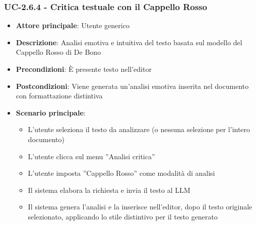 \documentclass[11pt,a4paper]{article}
\begin{document}
\subsubsection{UC-2.6.4 - Critica testuale con il Cappello Rosso}
\begin{itemize}
    \item \textbf{Attore principale}: Utente generico
    \item \textbf{Descrizione}: Analisi emotiva e intuitiva del testo basata sul modello del Cappello Rosso di De Bono
    \item \textbf{Precondizioni}: È presente testo nell’editor
    \item \textbf{Postcondizioni}: Viene generata un’analisi emotiva inserita nel documento con formattazione distintiva
    \item \textbf{Scenario principale}:
    \begin{itemize}
        \item L’utente seleziona il testo da analizzare (o nessuna selezione per l'intero documento)
        \item L’utente clicca sul menu ”Analisi critica”
        \item L’utente imposta ”Cappello Rosso” come modalità di analisi
        \item Il sistema elabora la richiesta e invia il testo al LLM
        \item Il sistema genera l'analisi e la inserisce nell'editor, dopo il testo originale selezionato, applicando lo stile distintivo per il testo generato
    \end{itemize}
\end{itemize}
\end{document}
